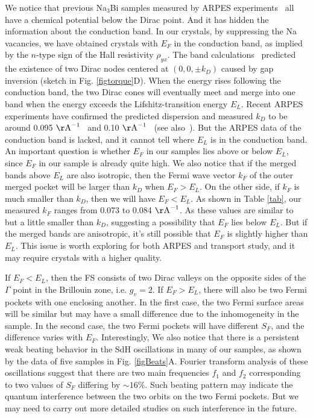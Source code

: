 We notice that previous Na$_3$Bi samples measured by ARPES experiments~\cite{Liu2014a, Xu2015, Xu2013} all have a chemical potential below the Dirac point. And it has hidden the information about the conduction band. In our crystals, by suppressing the Na vacancies, we have obtained crystals with $E_F$ in the conduction band, as implied by the $n$-type sign of the Hall resistivity $\rho_{yx}$. The band calculations~\cite{Wang2012} predicted the existence of two Dirac nodes centered at $(0,0,\pm k_D)$ caused by gap inversion (sketch in Fig. \ref{figtorque}D). When the energy rises following the conduction band, the two Dirac cones will eventually meet and merge into one band when the energy exceeds the Lifshitz-transition energy $E_L$. Recent ARPES experiments have confirmed the predicted dispersion and measured $k_D$ to be around 0.095 $\rm{\AA}^{-1}$~\cite{Liu2014a} and 0.10 $\rm{\AA}^{-1}$~\cite{Xu2013} (see also~\cite{Zhang2014}). But the ARPES data of the conduction band is lacked, and it cannot tell where $E_L$ is in the conduction band. An important question is whether $E_F$ in our samples lies above or below $E_L$, since $E_F$ in our sample is already quite high. We also notice that if the merged bands above $E_L$ are also isotropic, then the Fermi wave vector $k_F$ of the outer merged pocket will be larger than $k_D$ when $E_F > E_L$. On the other side, if $k_F$ is much smaller than $k_D$, then we will have  $E_F < E_L$. As shown in Table \ref{tab}, our measured $k_F$ ranges from 0.073 to 0.084 $\rm{\AA}^{-1}$. As these values are similar to but a little smaller than $k_D$, suggesting a possibility that $E_F$ lies below $E_L$. But if the merged bands are anisotropic, it's still possible that $E_F$ is slightly higher than $E_L$. This issue is worth exploring for both ARPES and transport study, and it may require crystals with a higher quality.

If $E_F < E_L$, then the FS consists of two Dirac valleys on the opposite sides of the $\Gamma$ point in the Brillouin zone, i.e. $g_v = 2$. If $E_F > E_L$, there will also be two Fermi pockets with one enclosing another. In the first case, the two Fermi surface areas will be similar but may have a small difference due to the inhomogeneity in the sample. In the second case, the two Fermi pockets will have different $S_F$, and the difference varies with $E_F$. Interestingly, We also notice that there is a persistent weak beating behavior in the SdH oscillations in many of our samples, as shown by the data of five samples in Fig. \ref{figBeats}A. Fourier transform analysis of these oscillations suggest that there are two main frequencies $f_1$ and $f_2$ corresponding to two values of $S_F$ differing by $\sim 16\%$. Such beating pattern may indicate the quantum interference between the two orbits on the two Fermi pockets. But we may need to carry out more detailed studies on such interference in the future.

